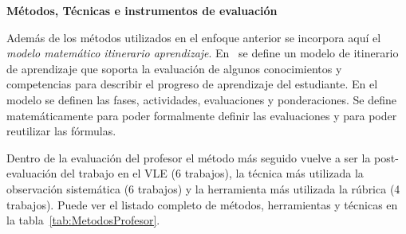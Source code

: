 

\bigskip
\textbf{Métodos, Técnicas e instrumentos de evaluación}
\bigskip

Además de los métodos utilizados en el enfoque anterior se incorpora aquí el \emph{modelo matemático itinerario aprendizaje}. En~\cite{yang2014fine} se define un modelo de itinerario de aprendizaje que soporta la evaluación de algunos conocimientos y competencias para describir el progreso de aprendizaje del estudiante. En el modelo se definen las fases, actividades, evaluaciones y ponderaciones. Se define matemáticamente para poder formalmente definir las evaluaciones y para poder reutilizar las fórmulas. 

Dentro de la evaluación del profesor el método más seguido vuelve a ser la post-evaluación del trabajo en el VLE (6 trabajos), la técnica más utilizada la observación sistemática (6 trabajos) y la herramienta más utilizada la rúbrica (4 trabajos). Puede ver el listado completo de métodos, herramientas y técnicas en la tabla~\ref{tab:MetodosProfesor}.


